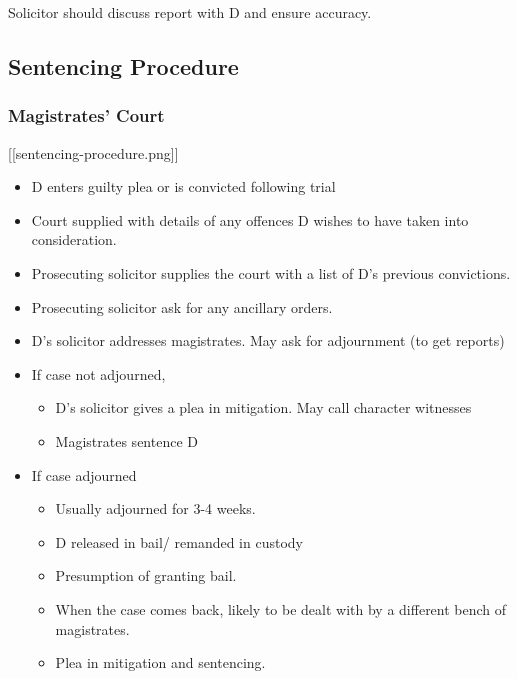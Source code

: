 \documentclass[
]{article}
\newenvironment{Shaded}{}{}
\newcommand{\NormalTok}[1]{#1}
\providecommand{\tightlist}{%
  \setlength{\itemsep}{0pt}\setlength{\parskip}{0pt}}
\begin{document}
\begin{Shaded}
\begin{Highlighting}[]
\NormalTok{Solicitor should discuss report with D and ensure accuracy.}
\end{Highlighting}
\end{Shaded}

\hypertarget{sentencing-procedure}{%
\subsection{Sentencing Procedure}\label{sentencing-procedure}}

\hypertarget{magistrates-court}{%
\subsubsection{Magistrates' Court}\label{magistrates-court}}

{[}{[}sentencing-procedure.png{]}{]}

\begin{itemize}
\tightlist
\item
  D enters guilty plea or is convicted following trial
\item
  Court supplied with details of any offences D wishes to have taken
  into consideration.
\item
  Prosecuting solicitor supplies the court with a list of D's previous
  convictions.
\item
  Prosecuting solicitor ask for any ancillary orders.
\item
  D's solicitor addresses magistrates. May ask for adjournment (to get
  reports)
\item
  If case not adjourned,

  \begin{itemize}
  \tightlist
  \item
    D's solicitor gives a plea in mitigation. May call character
    witnesses
  \item
    Magistrates sentence D
  \end{itemize}
\item
  If case adjourned

  \begin{itemize}
  \tightlist
  \item
    Usually adjourned for 3-4 weeks.
  \item
    D released in bail/ remanded in custody
  \item
    Presumption of granting bail.
  \item
    When the case comes back, likely to be dealt with by a different
    bench of magistrates.
  \item
    Plea in mitigation and sentencing.
  \end{itemize}
\end{itemize}
\end{document}

